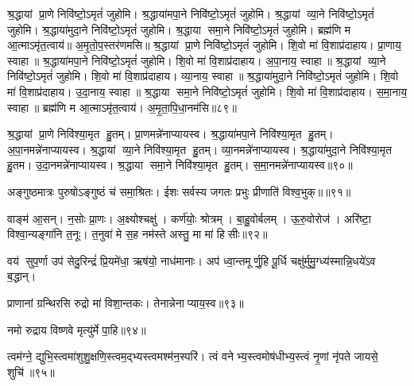 श्र॒द्धायां प्रा॒णे निवि॑ष्टो॒ऽमृतं॑ जुहोमि। श्र॒द्धाया॑मपा॒ने निवि॑ष्टो॒ऽमृतं॑ जुहोमि। श्र॒द्धायां व्या॒ने निवि॑ष्टो॒ऽमृतं॑ जुहोमि। श्र॒द्धाया॑मुदा॒ने निवि॑ष्टो॒ऽमृतं॑ जुहोमि। श्र॒द्धाया समा॒ने निवि॑ष्टो॒ऽमृतं॑ जुहोमि। ब्रह्म॑णि म आ॒त्माऽमृ॑त॒त्वाय॑॥ अ॒मृ॒तो॒प॒स्तर॑णमसि॥ श्र॒द्धायां प्रा॒णे निवि॑ष्टो॒ऽमृतं॑ जुहोमि। शि॒वो मा॑ वि॒शाप्र॑दाहाय। प्रा॒णाय॒ स्वाहा॥ श्र॒द्धाया॑मपा॒ने निवि॑ष्टो॒ऽमृतं॑ जुहोमि। शि॒वो मा॑ वि॒शाप्र॑दाहाय। अ॒पा॒नाय॒ स्वाहा॥ श्र॒द्धायां व्या॒ने निवि॑ष्टो॒ऽमृतं॑ जुहोमि। शि॒वो मा॑ वि॒शाप्र॑दाहाय। व्या॒नाय॒ स्वाहा॥ श्र॒द्धाया॑मुदा॒ने निवि॑ष्टो॒ऽमृतं॑ जुहोमि। शि॒वो मा॑ वि॒शाप्र॑दाहाय। उ॒दा॒नाय॒ स्वाहा॥ श्र॒द्धाया समा॒ने निवि॑ष्टो॒ऽमृतं॑ जुहोमि। शि॒वो मा॑ वि॒शाप्र॑दाहाय। स॒मा॒नाय॒ स्वाहा॥ ब्रह्म॑णि म आ॒त्माऽमृ॑त॒त्वाय॑। अ॒मृ॒ता॒पि॒धा॒नम॑सि॥८९॥
 \anuvakamend


श्र॒द्धायां प्रा॒णे निवि॑श्या॒मृत हु॒तम्। प्रा॒णमन्ने॑नाप्यायस्व। श्र॒द्धाया॑मपा॒ने निवि॑श्या॒मृत हु॒तम्। अ॒पा॒नमन्ने॑नाप्यायस्व।
श्र॒द्धायां व्या॒ने निवि॑श्या॒मृत हु॒तम्। व्या॒नमन्ने॑नाप्यायस्व। श्र॒द्धाया॑मुदा॒ने निवि॑श्या॒मृत हु॒तम। उ॒दा॒नमन्ने॑नाप्यायस्व।
श्र॒द्धाया समा॒ने निवि॑श्या॒मृत हु॒तम्। स॒मा॒नमन्ने॑नाप्या\-यस्व॥९०॥\anuvakamend

अङ्गुष्ठमात्रः पुरुषोऽङ्गुष्ठं च॑ समा॒श्रितः। ईशः सर्वस्य जगतः प्रभुः प्रीणाति॑ विश्व॒भुक्॥॥९१॥\anuvakamend

वाङ्म॑ आ॒सन्। न॒सोः प्रा॒णः। अ॒क्ष्योश्चक्षु॑। कर्ण॑योः॒ श्रोत्रम्। बा॒हु॒वोर्बलम्। ऊ॒रु॒वोरोज॑। अरि॑ष्टा॒ विश्वा॒न्यङ्गा॑नि त॒नूः। त॒नुवा॑ मे स॒ह नम॑स्ते अस्तु॒ मा मा॑ हिसीः॥९२॥
\anuvakamend

वय॑ सुप॒र्णा उप॑ सेदु॒रिन्द्रं॑ प्रि॒यमे॑धा॒ ऋष॑यो॒ नाध॑मानाः। अप॑ ध्वा॒न्तमूर्णु॒हि पू॒र्धि चक्षु॑र्मुमु॒ग्ध्य॑स्मान्नि॒धये॑ऽव ब॒द्धान्।\anuvakamend

प्राणानां ग्रन्थिरसि रुद्रो मा॑ विशा॒न्तकः। तेनान्नेनाप्या\-य॒स्व॥९३॥ \anuvakamend

नमो रुद्राय विष्णवे मृत्यु॑र्मे पा॒हि॥९४॥ \anuvakamend


त्वम॑ग्ने॒ द्युभि॒स्त्वमा॑शुशु॒क्षणि॒स्त्वम॒द्भ्यस्त्वमश्म॑न॒स्परि॑। त्वं वनेभ्य॒स्त्वमोष॑धीभ्य॒स्त्वं नृ॒णां नृ॑पते जायसे॒ शुचि॑॥९५॥
\anuvakamend

